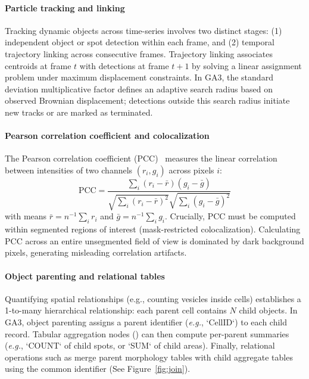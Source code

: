 \paragraph{Particle tracking and linking} Tracking dynamic objects across time-series involves two distinct stages: (1) independent object or spot detection within each frame, and (2) temporal trajectory linking across consecutive frames. Trajectory linking associates centroids at frame $t$ with detections at frame $t+1$ by solving a linear assignment problem under maximum displacement constraints. In GA3, the standard deviation multiplicative factor defines an adaptive search radius based on observed Brownian displacement; detections outside this search radius initiate new tracks or are marked as terminated.

\paragraph{Pearson correlation coefficient and colocalization} The Pearson correlation coefficient (PCC)~\cite{pcc} measures the linear correlation between intensities of two channels $(r_i,g_i)$ across pixels $i$:
$$\mathrm{PCC} = \frac{\sum_i(r_i-\bar{r})(g_i-\bar{g})}{\sqrt{\sum_i(r_i-\bar{r})^2} \sqrt{\sum_i(g_i-\bar{g})^2}}$$
with means $\bar{r} = n^{-1}\sum_i r_i$ and $\bar{g} = n^{-1}\sum_i g_i$. Crucially, PCC must be computed within segmented regions of interest (mask-restricted colocalization). Calculating PCC across an entire unsegmented field of view is dominated by dark background pixels, generating misleading correlation artifacts.

\paragraph{Object parenting and relational tables} Quantifying spatial relationships (e.g., counting vesicles inside cells) establishes a 1-to-many hierarchical relationship: each parent cell contains $N$ child objects. In GA3, object parenting assigns a parent identifier (\textit{e.g.}, `CellID`) to each child record. Tabular aggregation nodes () can then compute per-parent summaries (\textit{e.g.}, `COUNT` of child spots, or `SUM` of child areas). Finally, relational operations such as  merge parent morphology tables with child aggregate tables using the common identifier (See Figure~\ref{fig:join}).


